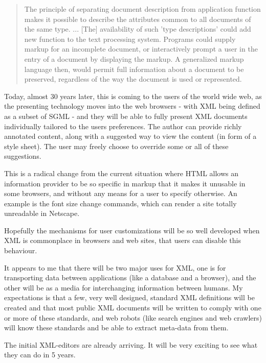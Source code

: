 \begin{quote}
  The principle of separating document description from application
  function makes it possible to describe the attributes common to all
  documents of the same type. ... [The] availability of such 'type
  descriptions' could add new function to the text processing system.
  Programs could supply markup for an incomplete document, or
  interactively prompt a user in the entry of a document by displaying
  the markup. A generalized markup language then, would permit full
  information about a document to be preserved, regardless of the way
  the document is used or represented.
\end{quote}

Today, almost 30 years later, this is coming to the users of the world
wide web, as the presenting technology moves into the web browsers -
with XML being defined as a subset of SGML - and they will be able to
fully present XML documents individually tailored to the users
preferences.  The author can provide richly annotated content, along
with a suggested way to view the content (in form of a style sheet).
The user may freely choose to override some or all of these suggestions.

This is a radical change from the current situation where HTML allows
an information provider to be so specific in markup that it makes it
unusable in some browsers, and without any means for a user to specify
otherwise.    An example is the font size change commands, which can
render a site totally unreadable in Netscape.

Hopefully the mechanisms for user customizations will be so well
developed when XML is commonplace in browsers and web sites, that 
users can disable this behaviour.

It appears to me that there will be two major uses for XML, one is for
transporting data between applications (like a database and a
browser), and the other will be as a media for interchanging
information between humans.  My expectations is that a few, very well
designed, standard XML definitions will be created and that most
public XML documents will be written to comply with one or more of
these standards, and web robots (like search engines and web crawlers)
will know these standards and be able to extract meta-data from them.

The initial XML-editors are already arriving.  It will be very
exciting to see what they can do in 5 years.



